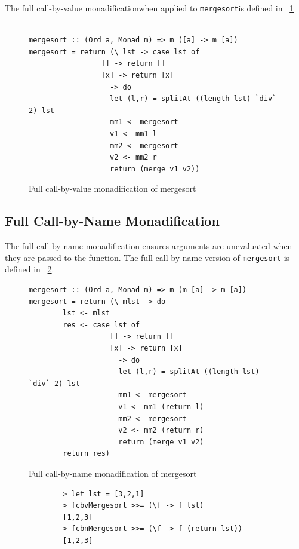 The full call-by-value monadification\DIFaddbegin \DIFadd{, }\DIFaddend when applied to \texttt{mergesort}\DIFaddbegin \DIFadd{, }\DIFaddend is defined in \DIFdelbegin {}\DIFdelend \DIFaddbegin {}\DIFaddend ~\ref{fcbv}

\begin{figure}[t]
\begin{lstlisting}

mergesort :: (Ord a, Monad m) => m ([a] -> m [a])
mergesort = return (\ lst -> case lst of
                 [] -> return []
                 [x] -> return [x]
                 _ -> do
                   let (l,r) = splitAt ((length lst) `div` 2) lst
                   mm1 <- mergesort
                   v1 <- mm1 l
                   mm2 <- mergesort
                   v2 <- mm2 r
                   return (merge v1 v2))					
\end{lstlisting}
\caption{Full call-by-value monadification of mergesort}
\label{fcbv}
\end{figure}

\subsection{Full Call-by-Name Monadification}

The full call-by-name monadification \DIFaddbegin {}\DIFaddend ensures arguments are unevaluated when they are passed to the function. The full call-by-name version of \texttt{mergesort} is defined in \DIFdelbegin {}\DIFdelend \DIFaddbegin {}\DIFaddend ~\ref{fcbn}.


\begin{figure}[t]
\begin{lstlisting}
mergesort :: (Ord a, Monad m) => m (m [a] -> m [a])
mergesort = return (\ mlst -> do
		lst <- mlst			
		res <- case lst of
                   [] -> return []
                   [x] -> return [x]
                   _ -> do
                     let (l,r) = splitAt ((length lst) `div` 2) lst
                     mm1 <- mergesort
                     v1 <- mm1 (return l)
                     mm2 <- mergesort
                     v2 <- mm2 (return r)
                     return (merge v1 v2)
		return res)					
\end{lstlisting}
\caption{Full call-by-name monadification of mergesort}
\label{fcbn}
\end{figure}

\DIFaddbegin \begin{figure}[t]
	\begin{lstlisting}
		> let lst = [3,2,1]
		> fcbvMergesort >>= (\f -> f lst)
		[1,2,3]
		> fcbnMergesort >>= (\f -> f (return lst))
		[1,2,3]
	\end{lstlisting}
	\caption{\texttt{} \texttt{} }
	\label{fullMonadExs}
\end{figure}

